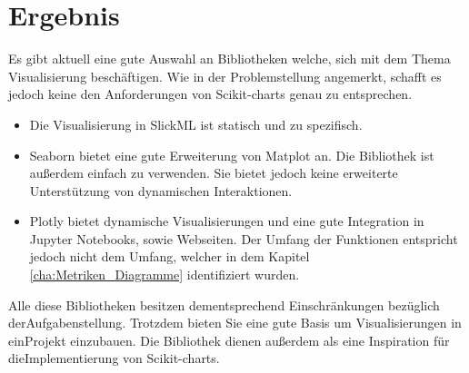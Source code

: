
\section{Ergebnis}

Es gibt aktuell eine gute Auswahl an Bibliotheken welche, sich mit dem Thema Visualisierung beschäftigen. Wie in der Problemstellung angemerkt, schafft es jedoch keine den Anforderungen von Scikit-charts genau zu entsprechen.\\
\begin{itemize}
    \item Die Visualisierung in SlickML ist statisch und zu spezifisch. 
    \item Seaborn bietet eine gute Erweiterung von Matplot an. Die Bibliothek ist außerdem einfach zu verwenden. Sie bietet jedoch keine erweiterte Unterstützung von dynamischen Interaktionen.
    \item Plotly bietet dynamische Visualisierungen und eine gute Integration in Jupyter Notebooks, sowie Webseiten. Der Umfang der Funktionen entspricht jedoch nicht dem Umfang, welcher in dem Kapitel \ref{cha:Metriken_Diagramme} identifiziert wurden.
\end{itemize}

\vspace{\baselineskip}

\noindent Alle diese Bibliotheken besitzen dementsprechend Einschränkungen bezüglich der\linebreak Aufgabenstellung. Trotzdem bieten Sie eine gute Basis um Visualisierungen in ein\linebreak Projekt einzubauen. Die Bibliothek dienen außerdem als eine Inspiration für die\linebreak Implementierung von Scikit-charts.


